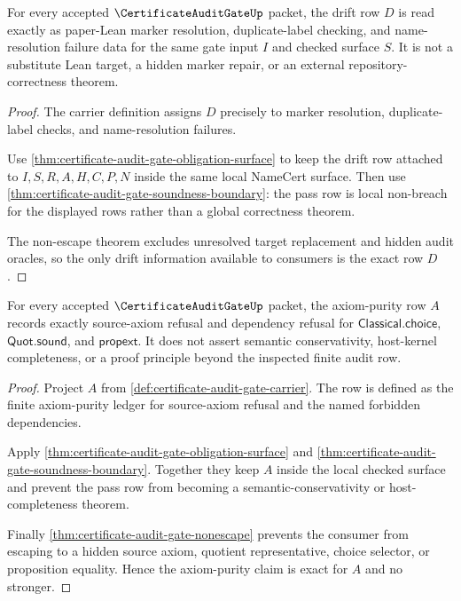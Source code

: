 \begin{theorem}
\label{thm:certificate-audit-gate-drift-exactness}
For every accepted $\CertificateAuditGateUp$ packet, the drift row $D$ is read exactly as paper-Lean marker resolution, duplicate-label checking, and name-resolution failure data for the same gate input $I$ and checked surface $S$. It is not a substitute Lean target, a hidden marker repair, or an external repository-correctness theorem.
\end{theorem}
\begin{proof}
The carrier definition assigns $D$ precisely to marker resolution, duplicate-label checks, and name-resolution failures.

Use \autoref{thm:certificate-audit-gate-obligation-surface} to keep the drift row attached to $I,S,R,A,H,C,P,N$ inside the same local NameCert surface. Then use \autoref{thm:certificate-audit-gate-soundness-boundary}: the pass row is local non-breach for the displayed rows rather than a global correctness theorem.

The non-escape theorem excludes unresolved target replacement and hidden audit oracles, so the only drift information available to consumers is the exact row $D$.
\end{proof}

\begin{theorem}
\label{thm:certificate-audit-gate-axiom-purity-exactness}
For every accepted $\CertificateAuditGateUp$ packet, the axiom-purity row $A$ records exactly source-axiom refusal and dependency refusal for $\mathsf{Classical.choice}$, $\mathsf{Quot.sound}$, and $\mathsf{propext}$. It does not assert semantic conservativity, host-kernel completeness, or a proof principle beyond the inspected finite audit row.
\end{theorem}
\begin{proof}
Project $A$ from \autoref{def:certificate-audit-gate-carrier}. The row is defined as the finite axiom-purity ledger for source-axiom refusal and the named forbidden dependencies.

Apply \autoref{thm:certificate-audit-gate-obligation-surface} and \autoref{thm:certificate-audit-gate-soundness-boundary}. Together they keep $A$ inside the local checked surface and prevent the pass row from becoming a semantic-conservativity or host-completeness theorem.

Finally \autoref{thm:certificate-audit-gate-nonescape} prevents the consumer from escaping to a hidden source axiom, quotient representative, choice selector, or proposition equality. Hence the axiom-purity claim is exact for $A$ and no stronger.
\end{proof}

